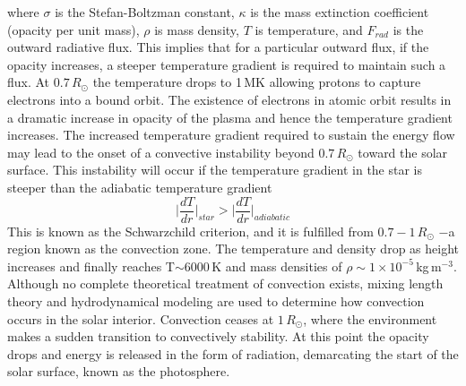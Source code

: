 where $\sigma$ is the Stefan-Boltzman constant, $\kappa$ is the mass extinction coefficient (opacity per unit mass), $\rho$ is mass density, $T$ is temperature, and $F_{rad}$ is the outward radiative flux. This implies that for a particular outward flux, if the opacity increases, a steeper temperature gradient is required to maintain such a flux. At $0.7\,R_{\odot}$ the temperature drops to 1\,MK allowing protons to capture electrons into a bound orbit. The existence of electrons in atomic orbit results in a dramatic increase in opacity of the plasma \citep{turk2011} and hence the temperature gradient increases. The increased temperature gradient required to sustain the energy flow may lead to the onset of a convective instability beyond $0.7\,R_{\odot}$ toward the solar surface. This instability will occur if the temperature gradient in the star is steeper than the adiabatic temperature gradient
\begin{equation}
\Bigg|\frac{dT}{dr}\Bigg|_{star} > \Bigg|\frac{dT}{dr}\Bigg|_{adiabatic}
\end{equation}
This is known as the Schwarzchild criterion, and it is fulfilled from $0.7-1\,R_{\odot}$ $-$a region known as the convection zone. The temperature and density drop as height increases and finally reaches T$\sim$$6000$\,K and mass densities of $\rho\sim1\times10^{-5}$\,kg\,m$^{-3}$. Although no complete theoretical treatment of convection exists, mixing length theory and hydrodynamical modeling are used to determine how convection occurs in the solar interior. Convection ceases at $1\,R_{\odot}$, where the environment makes a sudden transition to convectively stability. At this point the opacity drops and energy is released in the form of radiation, demarcating the start of the solar surface, known as the photosphere. 

